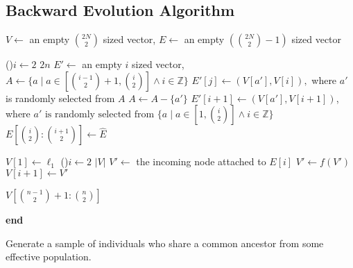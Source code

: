 \subsection{Backward Evolution Algorithm}\label{subsec:backwardEvolutionAlgorithm}
\begin{algorithm}[t]
    \SetAlgoLined
    \DontPrintSemicolon
     {
        $V \gets $ an empty $\binom{2N}{2}$ sized vector,
        $E \gets $ an empty $(\binom{2N}{2} - 1)$ sized vector \;

        \;
        \For(){$i \gets 2$ \KwTo $2n$} {
            $E' \gets $ an empty $i$ sized vector,
            $A \gets \{ a \mid a \in [\binom{i - 1}{2} + 1, \binom{i}{2}] \land i \in \mathbb{Z} \}$ \;
             {
                $E'[j] \gets (V[a'], V[i]),$ where $a'$ is randomly selected from $A$ \;
                $A \gets A - \{ a' \}$ \;
            }
            $E'[i + 1] \gets (V[a'], V[i + 1])$, where $ a' \text{ is randomly selected from } \{ a \mid a \in
            [1, \binom{i}{2}] \land i \in \mathbb{Z} \}$ \; \label{algline:coalescentEvent}
            $E[\binom{i}{2}:\binom{i + 1}{2}] \gets \hat{E}$ \;
        }

        \;
        $V[1] \gets \ell_1$ \;
        \For(){$i \gets 2$ \KwTo $| V |$} {
            $V' \gets $ the incoming node attached to $E[i]$ \;
             {
                $V' \gets f(V')$ \;
            }
            $V[i + 1] \gets V'$ \;
        }

        \Return $V[\binom{n - 1}{2} + 1:\binom{n}{2}]$ \;
    }
    \textbf{end} \;
    \caption{Generate a sample of individuals who share a common ancestor from some effective population.}
    \label{alg:twoStageBackwardEvolution}
\end{algorithm}

